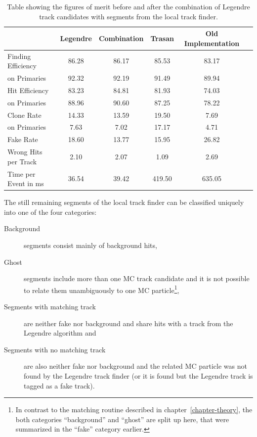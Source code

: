 \begin{table}
  \caption{Table showing the figures of merit before and after the combination of Legendre track candidates with segments from the local track finder.}
  \centering
  \begin{tabular}{lccccc} \toprule
    & Legendre & Combination & Trasan & Old Implementation \\ \midrule
    Finding Efficiency   & 86.28 & 86.17 & 85.53 & 83.17 \\
    \quad on Primaries   & 92.32 & 92.19 & 91.49 & 89.94 \\ 
    Hit Efficiency       & 83.23 & 84.81 & 81.93 & 74.03 \\
    \quad on Primaries   & 88.96 & 90.60 & 87.25 & 78.22 \\ 
    Clone Rate           & 14.33 & 13.59 & 19.50 & 7.69 \\
    \quad on Primaries   & 7.63  & 7.02  & 17.17 & 4.71 \\ 
    Fake Rate            & 18.60 & 13.77 & 15.95 & 26.82 \\ 
    Wrong Hits per Track & 2.10  & 2.07  & 1.09  & 2.69 \\ 
    Time per Event in ms & 36.54 & 39.42 & 419.50& 635.05 \\ \bottomrule
  \end{tabular}
  \label{tab-segment-track-combiner-fom}
\end{table}

The still remaining segments of the local track finder can be classified uniquely into one of the four categories:
\begin{description}
  \item[Background] segments consist mainly of background hits,
  \item[Ghost] segments include more than one MC track candidate and it is not possible to relate them unambiguously to one MC particle\footnote{In contrast to the matching routine described in chapter~\ref{chapter-theory}, the both categories ``background'' and ``ghost'' are split up here, that were summarized in the ``fake'' category earlier.},
  \item[Segments with matching track] are neither fake nor background and share hits with a track from the Legendre algorithm and
  \item[Segments with no matching track] are also neither fake nor background and the related MC particle was not found by the Legendre track finder (or it is found but the Legendre track is tagged as a fake track).
\end{description}


